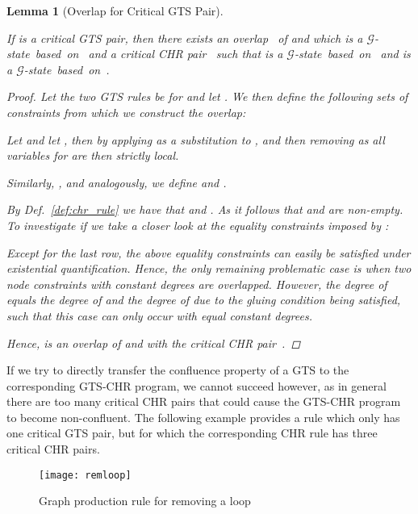 \documentclass{tlp}
\newtheorem{lemma}[theorem]{Lemma}
\newcommand{\mcG}{\ensuremath{\mathcal{G}}}
\begin{document}
\begin{lemma}[Overlap for Critical GTS Pair]\label{lem:cp_gts_chr}

If  is a critical GTS pair, then there exists an overlap~
of  and
 which is a
\mcG-state~based~on~ and a critical CHR pair~ such that
 is a \mcG-state~based~on~ and  is a
\mcG-state~based~on~.

\begin{proof}

Let the two GTS rules be  for  and let
. We then define the following sets of constraints
from which we construct the overlap: 

Let  and let , then  by
applying  as a substitution to , and then removing  as all
 variables for  are then strictly
local.

Similarly, , and analogously, we define 
and .

By Def.~\ref{def:chr_rule} we have that   and . As  it follows that  and  are
non-empty. To investigate if  we take a closer
look at the equality constraints imposed by : 

Except for the last row, the above equality constraints can easily be satisfied
under existential quantification. Hence, the only remaining problematic case is
when two node constraints with constant degrees are overlapped. However, the
degree of  equals the degree of  and the degree of
 due to the gluing condition being satisfied, such that this case can only
occur with equal constant degrees.

Hence,  is
an overlap of  and  with the critical CHR
pair~.\end{proof}

\end{lemma}

If we try to directly transfer the confluence property of a GTS to the
corresponding GTS-CHR program, we cannot succeed however, as in general there are
too many critical CHR pairs that could cause the GTS-CHR program to become
non-confluent. The following example provides a rule which only has one critical
GTS pair, but for which the corresponding CHR rule has three critical CHR pairs.

\begin{figure}
\texttt{[image: remloop]}
\caption{Graph production rule for removing a loop} 
\label{fig:remloop}
\end{figure}
\end{document}
